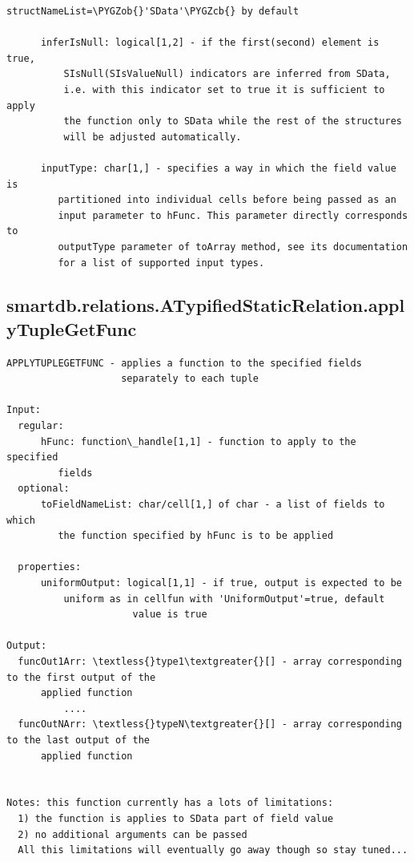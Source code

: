 \documentclass[letterpaper,10pt,english]{sphinxmanual}
\def\PYGZob{\char`\{}
\def\PYGZcb{\char`\}}
\begin{document}
\begin{Verbatim}[commandchars=\\\{\}]
        structNameList=\PYGZob{}'SData'\PYGZcb{} by default

      inferIsNull: logical[1,2] - if the first(second) element is true,
          SIsNull(SIsValueNull) indicators are inferred from SData,
          i.e. with this indicator set to true it is sufficient to apply
          the function only to SData while the rest of the structures
          will be adjusted automatically.

      inputType: char[1,] - specifies a way in which the field value is
         partitioned into individual cells before being passed as an
         input parameter to hFunc. This parameter directly corresponds to
         outputType parameter of toArray method, see its documentation
         for a list of supported input types.
\end{Verbatim}


\subsection{smartdb.relations.ATypifiedStaticRelation.applyTupleGetFunc}
\label{chap_functions:smartdb-relations-atypifiedstaticrelation-applytuplegetfunc}
\begin{Verbatim}[commandchars=\\\{\}]
APPLYTUPLEGETFUNC - applies a function to the specified fields
                    separately to each tuple

Input:
  regular:
      hFunc: function\_handle[1,1] - function to apply to the specified
         fields
  optional:
      toFieldNameList: char/cell[1,] of char - a list of fields to which
         the function specified by hFunc is to be applied

  properties:
      uniformOutput: logical[1,1] - if true, output is expected to be
          uniform as in cellfun with 'UniformOutput'=true, default
                      value is true

Output:
  funcOut1Arr: \textless{}type1\textgreater{}[] - array corresponding to the first output of the
      applied function
          ....
  funcOutNArr: \textless{}typeN\textgreater{}[] - array corresponding to the last output of the
      applied function


Notes: this function currently has a lots of limitations:
  1) the function is applies to SData part of field value
  2) no additional arguments can be passed
  All this limitations will eventually go away though so stay tuned...
\end{Verbatim}
\end{document}
